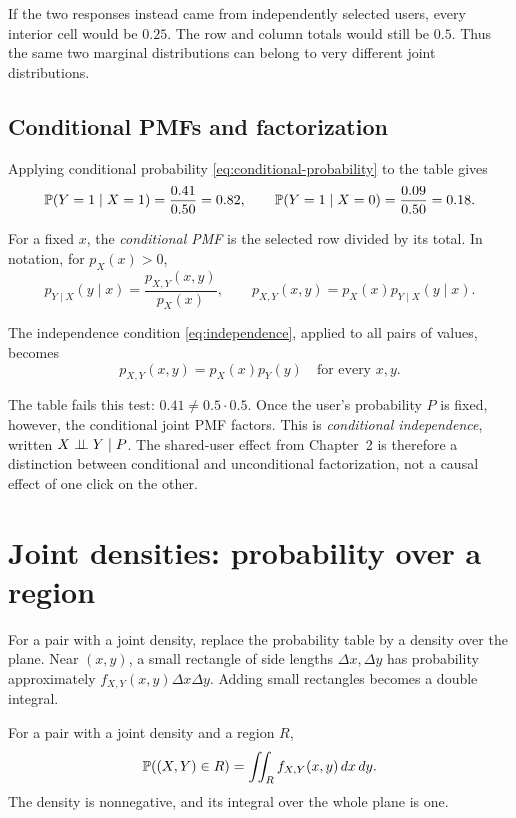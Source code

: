 If the two responses instead came from independently selected users,
every interior cell would be \(0.25\). The row and column totals would
still be \(0.5\). Thus the same two marginal distributions can belong
to very different joint distributions.

\subsection{Conditional PMFs and factorization}

Applying conditional probability \eqref{eq:conditional-probability} to
the table gives
\[
  \mathbb{P}(Y=1\mid X=1)=\frac{0.41}{0.50}=0.82,\qquad
  \mathbb{P}(Y=1\mid X=0)=\frac{0.09}{0.50}=0.18.
\]
\begin{definition}
For a fixed \(x\), the \emph{conditional PMF} is the selected row
divided by its total. In notation, for \(p_X(x)>0\),
\begin{equation}
  p_{Y\mid X}(y\mid x)=\frac{p_{X,Y}(x,y)}{p_X(x)},
  \qquad
  p_{X,Y}(x,y)=p_X(x)p_{Y\mid X}(y\mid x).
  \label{eq:joint-factorization-discrete}
\end{equation}
\end{definition}
\begin{result}
The independence condition \eqref{eq:independence}, applied to all
pairs of values, becomes
\begin{equation}
  p_{X,Y}(x,y)=p_X(x)p_Y(y)\quad\text{for every }x,y.
  \label{eq:joint-independence-discrete}
\end{equation}
\end{result}
The table fails this test: \(0.41\ne0.5\cdot0.5\). Once the user's
probability \(P\) is fixed, however, the conditional joint PMF factors.
This is \emph{conditional independence}, written
\(X\mathrel{\perp\!\!\!\perp} Y\mid P\). The shared-user effect from Chapter~2
is therefore a distinction between conditional and unconditional
factorization, not a causal effect of one click on the other.

\section{Joint densities: probability over a region}
\label{sec:joint-densities}

For a pair with a joint density, replace the probability table by a density over
the plane. Near \((x,y)\), a small rectangle of side lengths
\(\Delta x,\Delta y\) has probability approximately
\(f_{X,Y}(x,y)\Delta x\Delta y\). Adding small rectangles becomes a
double integral.
\begin{definition}
For a pair with a joint density and a region \(R\),
\[
  \mathbb{P}((X,Y)\in R)=\iint_R f_{X,Y}(x,y)\,dx\,dy.
\]
The density is nonnegative, and its integral over the whole plane is one.
\end{definition}

